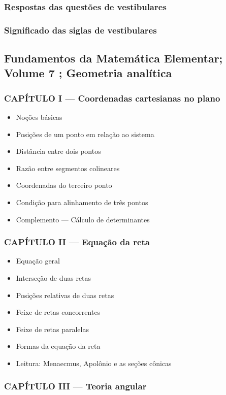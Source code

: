 \documentclass[a4paper,12pt]{article}[abntex2]
\begin{document}
\subsubsection*{Respostas das questões de vestibulares}

\subsubsection*{Significado das siglas de vestibulares}
 
 \subsection{Fundamentos da Matemática Elementar; Volume 7 ; Geometria analítica}
 \subsubsection*{CAPÍTULO I — Coordenadas cartesianas no plano}

\begin{itemize}
\item Noções básicas
\item Posições de um ponto em relação ao sistema
\item Distância entre dois pontos
\item Razão entre segmentos colineares
\item Coordenadas do terceiro ponto
\item Condição para alinhamento de três pontos
\item Complemento — Cálculo de determinantes
\end{itemize}
\subsubsection*{CAPÍTULO II — Equação da reta}

\begin{itemize}
\item Equação geral
\item Interseção de duas retas
\item Posições relativas de duas retas
\item Feixe de retas concorrentes
\item Feixe de retas paralelas
\item Formas da equação da reta
\item Leitura: Menaecmus, Apolônio e as seções cônicas
\end{itemize}
\subsubsection*{CAPÍTULO III — Teoria angular}
\end{document}
